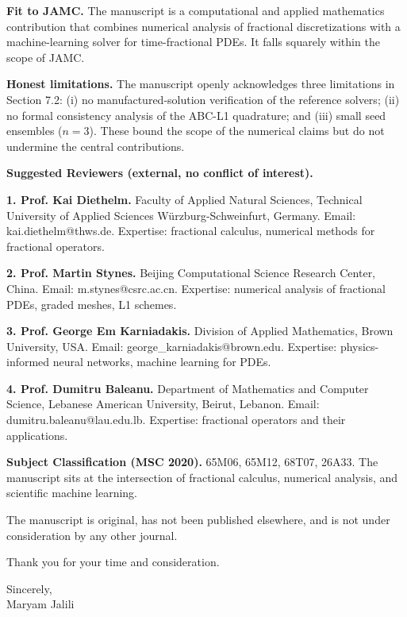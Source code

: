 \documentclass[11pt,a4paper]{article}
\begin{document}
\textbf{Fit to JAMC.} The manuscript is a computational and applied mathematics contribution that combines numerical analysis of fractional discretizations with a machine-learning solver for time-fractional PDEs. It falls squarely within the scope of JAMC.

\textbf{Honest limitations.} The manuscript openly acknowledges three limitations in Section 7.2: (i) no manufactured-solution verification of the reference solvers; (ii) no formal consistency analysis of the ABC-L1 quadrature; and (iii) small seed ensembles ($n=3$). These bound the scope of the numerical claims but do not undermine the central contributions.

\textbf{Suggested Reviewers (external, no conflict of interest).}

\textbf{1. Prof. Kai Diethelm.} Faculty of Applied Natural Sciences, Technical University of Applied Sciences W\"urzburg-Schweinfurt, Germany. Email: kai.diethelm@thws.de. Expertise: fractional calculus, numerical methods for fractional operators.

\textbf{2. Prof. Martin Stynes.} Beijing Computational Science Research Center, China. Email: m.stynes@csrc.ac.cn. Expertise: numerical analysis of fractional PDEs, graded meshes, L1 schemes.

\textbf{3. Prof. George Em Karniadakis.} Division of Applied Mathematics, Brown University, USA. Email: george\_karniadakis@brown.edu. Expertise: physics-informed neural networks, machine learning for PDEs.

\textbf{4. Prof. Dumitru Baleanu.} Department of Mathematics and Computer Science, Lebanese American University, Beirut, Lebanon. Email: dumitru.baleanu@lau.edu.lb. Expertise: fractional operators and their applications.

\textbf{Subject Classification (MSC 2020).} 65M06, 65M12, 68T07, 26A33. The manuscript sits at the intersection of fractional calculus, numerical analysis, and scientific machine learning.

The manuscript is original, has not been published elsewhere, and is not under consideration by any other journal.

Thank you for your time and consideration.

Sincerely, \\
Maryam Jalili
\end{document}
